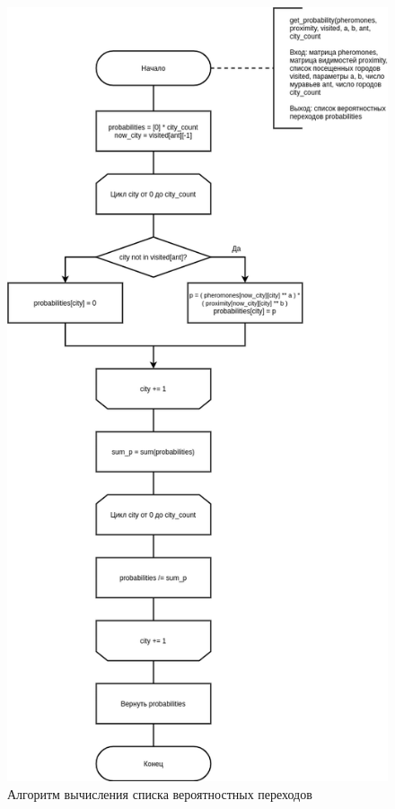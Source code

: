 \begin{figure}[!h]
	\centering
	\includegraphics[scale=0.5]{images/probability.png}
	\caption{Алгоритм вычисления списка вероятностных переходов}
	\label{img:probability}
\end{figure}

